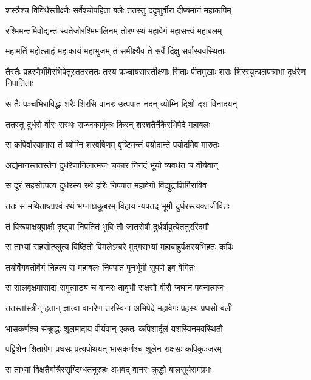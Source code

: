 \twolineshloka
{शस्त्रैश्च विविधैस्तीक्ष्णैः सर्वैश्चोपहिता बलैः}
{ततस्तु ददृशुर्वीरा दीप्यमानं महाकपिम्} %

\twolineshloka
{रश्मिमन्तमिवोद्यन्तं स्वतेजोरश्मिमालिनम्}
{तोरणस्थं महावेगं महासत्त्वं महाबलम्} %

\twolineshloka
{महामतिं महोत्साहं महाकायं महाभुजम्}
{तं समीक्ष्यैव ते सर्वे दिक्षु सर्वास्ववस्थिताः} %

\threelineshloka
{तैस्तैः प्रहरणैर्भीमैरभिपेतुस्ततस्ततः}
{तस्य पञ्चायसास्तीक्ष्णाः सिताः पीतमुखाः शराः}
{शिरस्युत्पलपत्राभा दुर्धरेण निपातिताः} %

\twolineshloka
{स तैः पञ्चभिराविद्धः शरैः शिरसि वानरः}
{उत्पपात नदन् व्योम्नि दिशो दश विनादयन्} %

\twolineshloka
{ततस्तु दुर्धरो वीरः सरथः सज्जकार्मुकः}
{किरन् शरशतैर्नैकैरभिपेदे महाबलः} %

\twolineshloka
{स कपिर्वारयामास तं व्योम्नि शरवर्षिणम्}
{वृष्टिमन्तं पयोदान्ते पयोदमिव मारुतः} %

\twolineshloka
{अर्द्यमानस्ततस्तेन दुर्धरेणानिलात्मजः}
{चकार निनदं भूयो व्यवर्धत च वीर्यवान्} %

\twolineshloka
{स दूरं सहसोत्पत्य दुर्धरस्य रथे हरिः}
{निपपात महावेगो विद्युद्राशिर्गिराविव} %

\twolineshloka
{ततः स मथिताष्टाश्वं रथं भग्नाक्षकूबरम्}
{विहाय न्यपतद् भूमौ दुर्धरस्त्यक्तजीवितः} %

\twolineshloka
{तं विरूपाक्षयूपाक्षौ दृष्ट्वा निपतितं भुवि}
{तौ जातरोषौ दुर्धर्षावुत्पेततुररिंदमौ} %

\twolineshloka
{स ताभ्यां सहसोत्प्लुत्य विष्ठितो विमलेऽम्बरे}
{मुद्गराभ्यां महाबाहुर्वक्षस्यभिहतः कपिः} %

\twolineshloka
{तयोर्वेगवतोर्वेगं निहत्य स महाबलः}
{निपपात पुनर्भूमौ सुपर्ण इव वेगितः} %

\twolineshloka
{स सालवृक्षमासाद्य समुत्पाट्य च वानरः}
{तावुभौ राक्षसौ वीरौ जघान पवनात्मजः} %

\twolineshloka
{ततस्तांस्त्रीन् हतान् ज्ञात्वा वानरेण तरस्विना}
{अभिपेदे महावेगः प्रहस्य प्रघसो बली} %

\twolineshloka
{भासकर्णश्च संक्रुद्धः शूलमादाय वीर्यवान्}
{एकतः कपिशार्दूलं यशस्विनमवस्थितौ} %

\twolineshloka
{पट्टिशेन शिताग्रेण प्रघसः प्रत्यपोथयत्}
{भासकर्णश्च शूलेन राक्षसः कपिकुञ्जरम्} %

\twolineshloka
{स ताभ्यां विक्षतैर्गात्रैरसृग्दिग्धतनूरुहः}
{अभवद् वानरः क्रुद्धो बालसूर्यसमप्रभः} %

